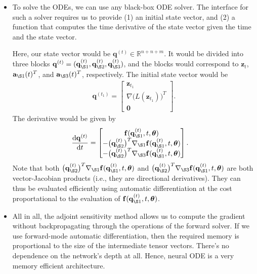 \documentclass[10pt]{article}
\newcommand{\dee}{\mathrm{d}}
\newcommand{\ve}[1]{\mathbf{#1}}
\newcommand{\ves}[1]{\boldsymbol{#1}}
\newcommand{\Real}{\mathbb{R}}
\begin{document}
\begin{itemize}
  \item To solve the ODEs, we can use any black-box ODE solver. The interface for such a solver requires us to provide (1) an initial state vector, and (2) a function that computes the time derivative of the state vector given the time and the state vector. 

  Here, our state vector would be $\ve{q}^{(t)} \in \Real^{n+n+m}$. It would be divided into three blocks $\ve{q}^{(t)} = (\ve{q}^{(t)}_{\S 1}, \ve{q}^{(t)}_{\S 2}, \ve{q}^{(t)}_{\S 3})$, and the blocks would correspond to $\ve{z}_t$, $\ve{a}_{\S 1}(t)^T$, and $\ve{a}_{\S 3}(t)^T$, respectively. The initial state vector would be
  \begin{align*}
    \ve{q}^{(t_1)} = \begin{bmatrix}
      \ve{z}_{t_1} \\
      \nabla \big( L(\ve{z}_{t_1}) \big)^T \\
      \ve{0}
    \end{bmatrix}.
  \end{align*}
  The derivative would be given by
  \begin{align*}
    \frac{\dee \ve{q}^{(t)}}{\dee t}
    &= \begin{bmatrix}
      \ve{f}(\ve{q}_{\S 1}^{(t)}, t, \ves{\theta}) \\
      -\big( \ve{q}^{(t)}_{\S 2}\big)^T \nabla_{\S 1}\ve{f}(\ve{q}_{\S 1}^{(t)}, t, \ves{\theta}) \\
      -\big( \ve{q}^{(t)}_{\S 2} \big)^T \nabla_{\S 3}\ve{f}(\ve{q}_{\S 1}^{(t)}, t, \ves{\theta}) 
    \end{bmatrix}.
  \end{align*}
  Note that both $\big( \ve{q}^{(t)}_{\S 2}\big)^T \nabla_{\S 1}\ve{f}(\ve{q}_{\S 1}^{(t)}, t, \ves{\theta})$ and $\big( \ve{q}^{(t)}_{\S 2} \big)^T \nabla_{\S 3}\ve{f}(\ve{q}_{\S 1}^{(t)}, t, \ves{\theta})$ are both vector-Jacobian products (i.e., they are directional derivatives). They can thus be evaluated efficiently using automatic differentiation at the cost proportational to the evaluation of $\ve{f}(\ve{q}_{\S 1}^{(t)}, t, \ves{\theta})$.

  \item All in all, the adjoint sensitivity method allows us to compute the gradient without backpropagating through the operations of the forward solver. If we use forward-mode automatic differentiation, then the required memory is proportional to the size of the intermediate tensor vectors. There's no dependence on the network's depth at all. Hence, neural ODE is a very memory efficient architecture.
\end{itemize}
\end{document}
